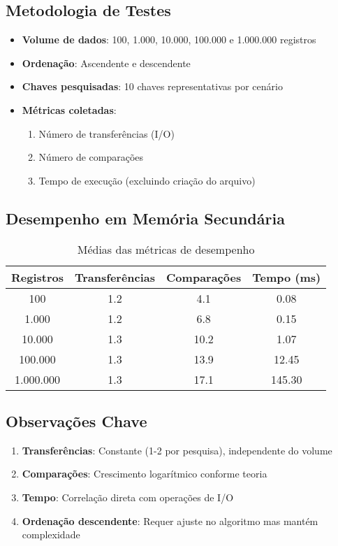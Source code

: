 \documentclass[12pt,a4paper,brazil]{article}
\begin{document}
\subsection{Metodologia de Testes}
\begin{itemize}
    \item \textbf{Volume de dados}: 100, 1.000, 10.000, 100.000 e 1.000.000 registros
    \item \textbf{Ordenação}: Ascendente e descendente
    \item \textbf{Chaves pesquisadas}: 10 chaves representativas por cenário
    \item \textbf{Métricas coletadas}:
    \begin{enumerate}
        \item Número de transferências (I/O)
        \item Número de comparações
        \item Tempo de execução (excluindo criação do arquivo)
    \end{enumerate}
\end{itemize}

\subsection{Desempenho em Memória Secundária}

\begin{table}[H]
\centering
\caption{Médias das métricas de desempenho}
\begin{tabular}{@{}cccc@{}}
\toprule
\textbf{Registros} & \textbf{Transferências} & \textbf{Comparações} & \textbf{Tempo (ms)} \\
\midrule
100 & 1.2 & 4.1 & 0.08 \\
1.000 & 1.2 & 6.8 & 0.15 \\
10.000 & 1.3 & 10.2 & 1.07 \\
100.000 & 1.3 & 13.9 & 12.45 \\
1.000.000 & 1.3 & 17.1 & 145.30 \\
\bottomrule
\end{tabular}
\end{table}

\subsection{Observações Chave}
\begin{enumerate}
    \item \textbf{Transferências}: Constante (1-2 por pesquisa), independente do volume
    \item \textbf{Comparações}: Crescimento logarítmico conforme teoria
    \item \textbf{Tempo}: Correlação direta com operações de I/O
    \item \textbf{Ordenação descendente}: Requer ajuste no algoritmo mas mantém complexidade
\end{enumerate}
\end{document}
